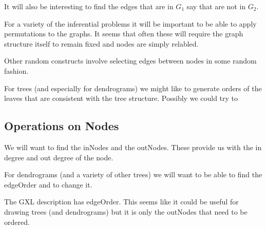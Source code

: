 It will also be interesting to find the edges that are in $G_1$ say
that are not in $G_2$.

For a variety of the inferential problems it will be important to be
able to apply permutations to the graphs. It seems that often these
will require the graph structure itself to remain fixed and nodes
are simply relabled.

Other random constructs involve selecting edges between nodes in some
random fashion.

For trees (and especially for dendrograms) we might like to generate 
orders of the leaves that are consistent with the tree structure.
Possibly we could try to 

\subsection{Operations on Nodes}

We will want to find the inNodes and the outNodes. These provide us
with the in degree and out degree of the node.

For dendrograms (and a variety of other trees) we will want to be able
to find the edgeOrder and to change it.

The GXL description has edgeOrder. This seems like it could be useful
for drawing trees (and dendrograms) but it is only the outNodes that
need to be ordered.





